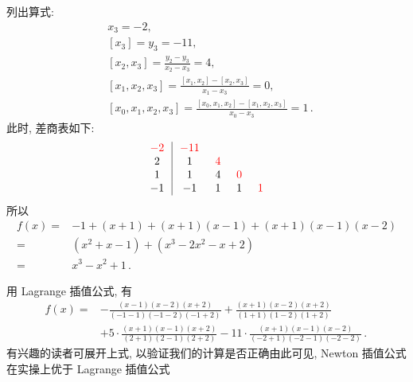 \begin{example}
    列出算式:
    \begin{align*}
         & x_3 = -2,                                                                              \\
         & [x_3] = y_3 = -11,                                                                     \\
         & [x_2, x_3] = \frac{y_2 - y_3}{x_2 - x_3} = 4,                                          \\
         & [x_1, x_2, x_3] = \frac{[x_1, x_2] - [x_2, x_3]}{x_1 - x_3} = 0,                       \\
         & [x_0, x_1, x_2, x_3] = \frac{[x_0, x_1, x_2] - [x_1, x_2, x_3]}{x_0 - x_3} = 1 \period
    \end{align*}
    此时, 差商表如下:
    \begin{align*}
        \arraycolsep=0.25cm
        \begin{array}{c|cccc}
            \textcolor{red}{-2} & \textcolor{red}{-11} & \                  & \                  & \                  \\
            2                   & 1                    & \textcolor{red}{4} & \                  & \                  \\
            1                   & 1                    & 4                  & \textcolor{red}{0} & \                  \\
            -1                  & -1                   & 1                  & 1                  & \textcolor{red}{1} \\
        \end{array}
    \end{align*}
    所以
    \begin{align*}
        f(x)
        = {} & -1 + (x + 1) + (x + 1)(x - 1) + (x + 1)(x - 1)(x - 2) \\
        = {} & (x^2 + x - 1) + (x^3 - 2x^2 - x + 2)                  \\
        = {} & x^3 - x^2 + 1 \period
    \end{align*}

    用 Lagrange 插值公式, 有
    \begin{align*}
        f(x)
        = {} & - \frac{(x-1)(x-2)(x+2)}{(-1-1)(-1-2)(-1+2)} + \frac{(x+1)(x-2)(x+2)}{(1+1)(1-2)(1+2)}                          \\
             & + 5 \cdot \frac{(x+1)(x-1)(x+2)}{(2+1)(2-1)(2+2)} - 11 \cdot \frac{(x+1)(x-1)(x-2)}{(-2+1)(-2-1)(-2-2)} \period
    \end{align*}
    有兴趣的读者可展开上式, 以验证我们的计算是否正确\period 由此可见, Newton 插值公式在实操上优于 Lagrange 插值公式\period
\end{example}
